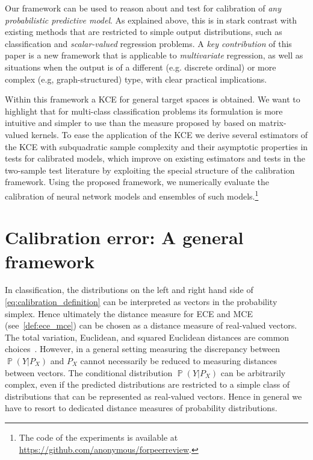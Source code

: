 \documentclass{article}
\DeclareMathOperator{\Prob}{\mathbb{P}}
\begin{document}
Our framework can be used to reason about and test for calibration of \emph{any
probabilistic predictive model}. As explained above, this is in stark contrast with
existing methods
that are restricted to simple output distributions, such as classification
and \emph{scalar-valued} regression problems. 
A \emph{key contribution} of this paper is a new framework that
is applicable to \emph{multivariate} regression, as well as situations when the output is of a
different (e.g. discrete ordinal) or more complex (e.g, graph-structured) type, with clear practical implications.

Within this framework a KCE for general target spaces is obtained. We want to highlight
that for multi-class classification problems its formulation is more intuitive and
simpler to use than the measure proposed by \citet{Widmann2019} based on matrix-valued
kernels.
To ease the application of the KCE we derive several
estimators of the KCE with subquadratic sample complexity and their asymptotic properties
in tests for calibrated models, which improve on existing estimators and tests in the
two-sample test literature by exploiting the special structure of the calibration
framework. Using the proposed framework, we numerically evaluate the calibration of neural
network models and ensembles of such models.\footnote{The code of the experiments
is available at \url{https://github.com/anonymous/forpeerreview}.}

\section{Calibration error: A general framework}

In classification, the distributions on the left and right hand side of
\cref{eq:calibration_definition} can be interpreted as vectors in the probability
simplex. Hence ultimately the distance measure for ECE and MCE
(see~\cref{def:ece_mce}) can be chosen as a distance measure of real-valued vectors.
The total variation, Euclidean, and squared Euclidean distances
are common choices~\citep{Guo2017,Kull2019,Vaicenavicius2019}.
However, in a general setting measuring the discrepancy between
$\Prob(Y|P_X)$ and $P_X$ cannot necessarily be reduced to measuring
distances between vectors. The conditional distribution $\Prob(Y|P_X)$ can
be arbitrarily complex, even if the predicted distributions are restricted to a
simple class of distributions that can be represented as real-valued
vectors. Hence in general we have to resort to dedicated distance measures
of probability distributions.
\end{document}
